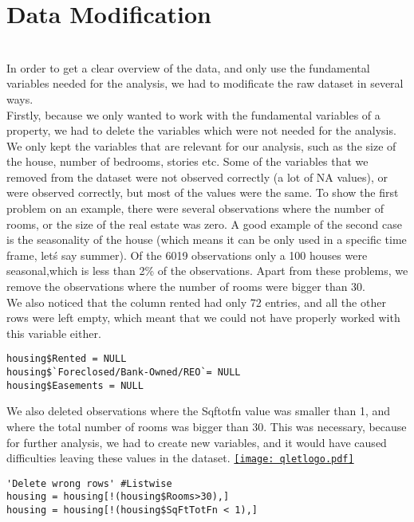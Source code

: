 

\section{Data Modification}\label{Sec:Modification}
\\
In order to get a clear overview of the data, and only use the fundamental variables needed for the analysis, we had to modificate the raw dataset in several ways. \\

Firstly, because we only wanted to work with the fundamental variables of a property,  we had to delete the variables which were not needed for the analysis. We only kept the variables that are relevant for our analysis, such as the size of the house, number of bedrooms, stories etc. Some of the variables that we removed from the dataset were not observed correctly (a lot of NA values), or were observed correctly, but most of the values were the same. To show the first problem on an example, there were several observations where the number of rooms, or the size of the real estate was zero.  A good example of the second case is the seasonality of the house (which means it can be only used in a specific time frame, let\'s say summer). Of the 6019 observations only a 100 houses were seasonal,which is less than 2\% of the observations. Apart from these problems, we remove the observations where the number of rooms were bigger than 30.\\
We also noticed that the column rented had only 72 entries, and all the other rows were left empty, which meant that we could not have properly worked with this variable either. \\

\begin{lstlisting}[frame = single,backgroundcolor=\color{hellgelb}]
housing$Rented = NULL
housing$`Foreclosed/Bank-Owned/REO`= NULL
housing$Easements = NULL
\end{lstlisting}


We also deleted observations where the Sqftotfn value was smaller than 1, and where the total number of rooms was bigger than 30. This was necessary, because for further analysis, we had to create new variables, and it would have caused difficulties leaving these values in the dataset. \href{https://github.com/arminecseri/SPL-SOSE-17/blob/master/deletingvariables.R}{\texttt{[image: qletlogo.pdf]}}\\

\begin{lstlisting}[frame = single,backgroundcolor=\color{hellgelb}]
'Delete wrong rows' #Listwise
housing = housing[!(housing$Rooms>30),]
housing = housing[!(housing$SqFtTotFn < 1),]
\end{lstlisting}

